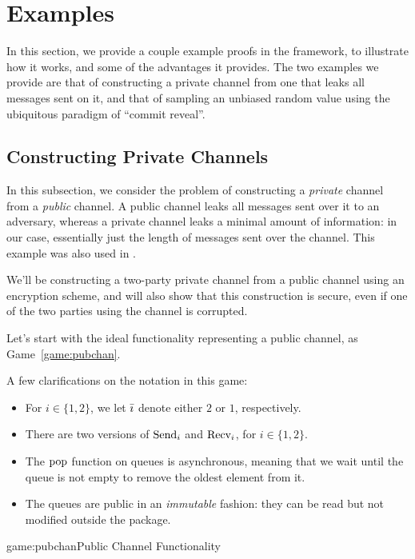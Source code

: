 \section{Examples}

In this section, we provide a couple example proofs in the framework,
to illustrate how it works, and some of the advantages it provides.
The two examples we provide are that of constructing a private
channel from one that leaks all messages sent on it,
and that of sampling an unbiased random value using
the ubiquitous paradigm of ``commit reveal''.

\subsection{Constructing Private Channels}

In this subsection, we consider the problem of constructing a \emph{private}
channel from a \emph{public} channel.
A public channel leaks all messages sent over it to an adversary,
whereas a private channel leaks a minimal amount of information:
in our case, essentially just the length of messages sent over the channel.
This example was also used in \cite{cramer2015secure}.

We'll be constructing a two-party private channel from a public channel
using an encryption scheme, and will also show that this construction is secure,
even if one of the two parties using the channel is corrupted.

Let's start with the ideal functionality representing a public channel,
as Game~\ref{game:pubchan}.

A few clarifications on the notation in this game:
\begin{itemize}
    \item For $i \in \{1, 2\}$, we let $\bar{\imath}$ denote either $2$ or $1$, respectively.
    \item There are two versions of $\text{Send}_i$ and $\text{Recv}_i$, for $i \in \{1, 2\}$.
    \item The $\text{pop}$ function on queues is asynchronous, meaning that we wait until the queue is not empty
    to remove the oldest element from it.
    \item The queues are public in an \emph{immutable} fashion: they can be read but not modified outside the package.
\end{itemize}

\begin{game}{game:pubchan}{Public Channel Functionality}
\end{game}

